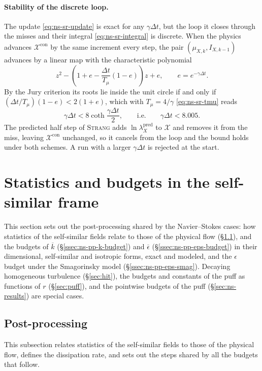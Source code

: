 \documentclass{article}
\begin{document}
\paragraph{Stability of the discrete loop.}
The update \eqref{eq:ns-sr-update} is exact for any $\gamma \Delta t$, but
the loop it closes through the misses and their integral
\eqref{eq:ns-sr-integral} is discrete. When the physics advances
$\mathcal{X}^{\mathrm{con}}$ by the same increment every step, the pair
$(\mu_{X,k}, I_{X,k-1})$ advances by a linear map with the characteristic
polynomial
\begin{equation}\label{eq:ns-sr-loop}
  z^2 - \left( 1 + e - \frac{\Delta t}{T_\mu} \left( 1 - e \right) \right) z + e,
  \qquad e = e^{-\gamma \Delta t} .
\end{equation}
By the Jury criterion its roots lie inside the unit circle if and only if
$(\Delta t / T_\mu)(1 - e) < 2(1 + e)$, which with $T_\mu = 4/\gamma$
\eqref{eq:ns-sr-tmu} reads
\begin{equation}\label{eq:ns-sr-stable}
  \gamma \Delta t < 8 \coth \frac{\gamma \Delta t}{2},
  \qquad\text{i.e.}\qquad
  \gamma \Delta t < 8.005 .
\end{equation}
The predicted half step of \textsc{Strang} adds $\ln \lambda_X^{\mathrm{pred}}$
to $\mathcal{X}$ and removes it from the miss, leaving
$\mathcal{X}^{\mathrm{con}}$ unchanged, so it cancels from the loop and the
bound holds under both schemes. A run with a larger $\gamma \Delta t$ is
rejected at the start.


\section{Statistics and budgets in the self-similar frame}\label{sec:budgets}
This section sets out the post-processing shared by the Navier--Stokes cases:
how statistics of the self-similar fields relate to those of the physical
flow (\S\ref{ssec:ns-postproc}), and the budgets of $\overline{k}$
(\S\ref{ssec:ns-pp-k-budget}) and $\overline{\epsilon}$
(\S\ref{ssec:ns-pp-eps-budget}) in their dimensional, self-similar and
isotropic forms, exact and modeled, and the $\epsilon$ budget under the
Smagorinsky model (\S\ref{ssec:ns-pp-eps-smag}). Decaying homogeneous turbulence
(\S\ref{sec:hit}), the budgets and constants of the puff as functions of $r$
(\S\ref{sec:puff}), and
the pointwise budgets of the puff (\S\ref{sec:ns-results}) are special cases.

\subsection{Post-processing}\label{ssec:ns-postproc}
This subsection relates statistics of the self-similar fields to those of the
physical flow, defines the dissipation rate, and sets out the steps shared by
all the budgets that follow.
\end{document}
